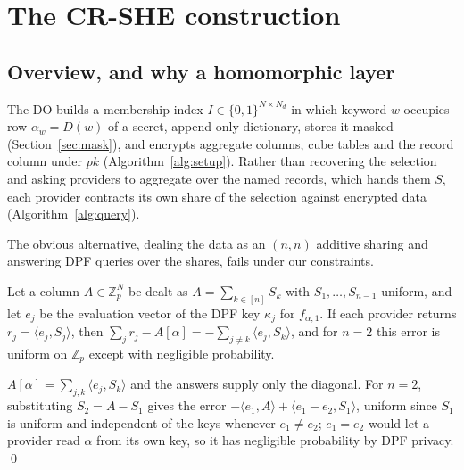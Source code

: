 \section{The CR-SHE construction}
\label{sec:construction}

\subsection{Overview, and why a homomorphic layer}
\label{sec:whyrep}
The DO builds a membership index $I\in\{0,1\}^{N\times N_d}$ in which keyword
$w$ occupies row $\alpha_w=D(w)$ of a secret, append-only dictionary, stores it
masked (Section~\ref{sec:mask}), and encrypts aggregate columns, cube tables
and the record column under $pk$ (Algorithm~\ref{alg:setup}). Rather than
recovering the selection and asking providers to aggregate over the named
records, which hands them $S$, each provider contracts its own share of the
selection against encrypted data (Algorithm~\ref{alg:query}).

The obvious alternative, dealing the data as an $(n,n)$ additive sharing and
answering DPF queries over the shares, fails under our constraints.

\begin{proposition}
\label{prop:nolocal}
Let a column $A\in\mathbb{Z}_p^N$ be dealt as $A=\sum_{k\in[n]}S_k$ with
$S_1,\dots,S_{n-1}$ uniform, and let $e_j$ be the evaluation vector of the DPF
key $\kappa_j$ for $f_{\alpha,1}$. If each provider returns
$r_j=\langle e_j,S_j\rangle$, then
$\sum_j r_j-A[\alpha]=-\sum_{j\neq k}\langle e_j,S_k\rangle$, and for $n=2$ this
error is uniform on $\mathbb{Z}_p$ except with negligible probability.
\end{proposition}
\begin{pf}
$A[\alpha]=\sum_{j,k}\langle e_j,S_k\rangle$ and the answers supply only the
diagonal. For $n=2$, substituting $S_2=A-S_1$ gives the error
$-\langle e_1,A\rangle+\langle e_1-e_2,S_1\rangle$, uniform since $S_1$ is
uniform and independent of the keys whenever $e_1\neq e_2$; $e_1=e_2$ would let
a provider read $\alpha$ from its own key, so it has negligible probability by
DPF privacy. \qed
\end{pf}

